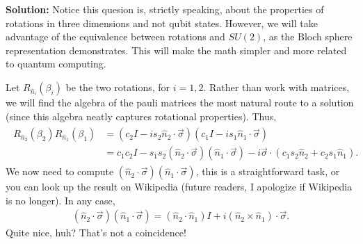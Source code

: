\documentclass{book}
\begin{document}
    \textbf{Solution:} Notice this quesion is, strictly speaking, about the properties of rotations in three dimensions and not qubit states. However, we will take advantage of the equivalence between rotations and $SU(2)$, as the Bloch sphere representation demonstrates. This will make the math simpler and more related to quantum computing.

    Let $R_{\hat{n}_i}(\beta_i)$ be the two rotations, for $i = 1,2$. Rather than work with matrices, we will find the algebra of the pauli matrices the most natural route to a solution (since this algebra neatly captures rotational properties). Thus,
    \begin{align} \label{eq:4.15_multalg}
    \begin{aligned}
        R_{\hat{n}_2}(\beta_2)R_{\hat{n}_1}(\beta_1) &= (c_2 I - i s_2 \hat{n}_2 \cdot \vec{\sigma})(c_1 I - i s_1 \hat{n}_1 \cdot \vec{\sigma}) \\
        &= c_1c_2 I - s_1 s_2 (\hat{n}_2 \cdot \vec{\sigma}) (\hat{n}_1 \cdot \vec{\sigma}) - i \vec{\sigma} \cdot (c_1 s_2 \hat{n}_2 + c_2 s_1 \hat{n}_1).
    \end{aligned}
    \end{align}
    We now need to compute $(\hat{n}_2 \cdot \vec{\sigma}) (\hat{n}_1 \cdot \vec{\sigma})$, this is a straightforward task, or you can look up the result on Wikipedia (future readers, I apologize if Wikipedia is no longer). In any case,
    \begin{align}
        (\hat{n}_2 \cdot \vec{\sigma}) (\hat{n}_1 \cdot \vec{\sigma}) = (\hat{n}_2 \cdot \hat{n}_1) I + i (\hat{n}_2 \times \hat{n}_1) \cdot \vec{\sigma}.
    \end{align}
    Quite nice, huh? That's not a coincidence! 
    
\end{document}
